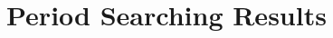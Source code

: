 \documentclass[twoside,twocolumn]{aastex63}
\begin{document}

\section{Period Searching Results}\label{sec:results}
\end{document}
